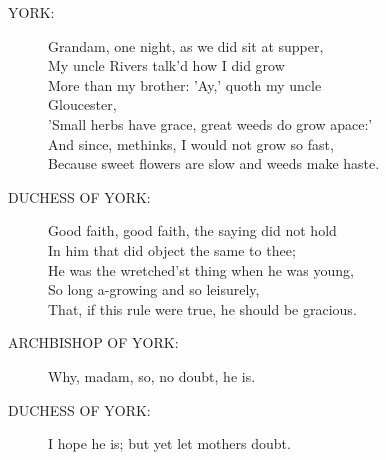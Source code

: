 \documentclass{article}
\begin{document}
\begin{description}
\item[YORK:] 
\hspace{1pt}Grandam, one night, as we did sit at supper,\\
\hspace{1pt}My uncle Rivers talk'd how I did grow\\
\hspace{1pt}More than my brother: 'Ay,' quoth my uncle\\
\hspace{1pt}Gloucester,\\
\hspace{1pt}'Small herbs have grace, great weeds do grow apace:'\\
\hspace{1pt}And since, methinks, I would not grow so fast,\\
\hspace{1pt}Because sweet flowers are slow and weeds make haste.\\
\end{description}
\begin{description}
\item[DUCHESS OF YORK:] 
\hspace{1pt}Good faith, good faith, the saying did not hold\\
\hspace{1pt}In him that did object the same to thee;\\
\hspace{1pt}He was the wretched'st thing when he was young,\\
\hspace{1pt}So long a-growing and so leisurely,\\
\hspace{1pt}That, if this rule were true, he should be gracious.\\
\end{description}
\begin{description}
\item[ARCHBISHOP OF YORK:] 
\hspace{1pt}Why, madam, so, no doubt, he is.\\
\end{description}
\begin{description}
\item[DUCHESS OF YORK:] 
\hspace{1pt}I hope he is; but yet let mothers doubt.\\
\end{description}
\end{document}
